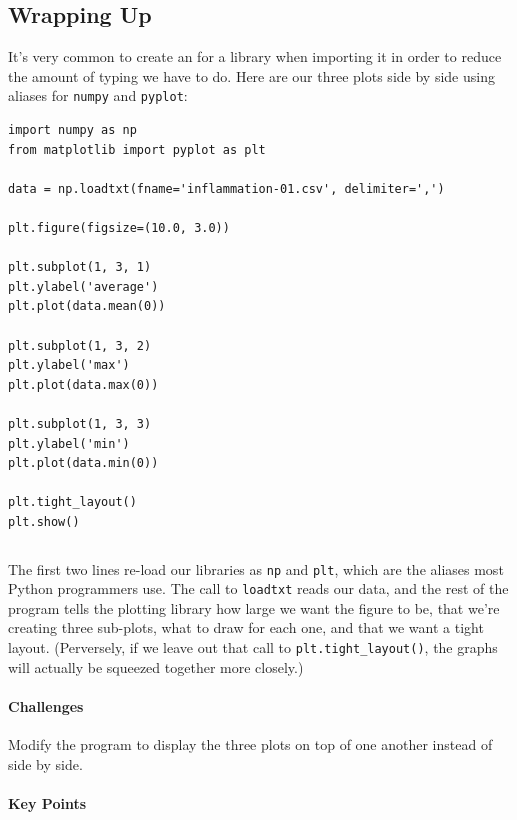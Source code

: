 \documentclass{book}
\begin{document}
\subsection{Wrapping Up}

It's very common to create an  for a
library when importing it in order to reduce the amount of typing we
have to do. Here are our three plots side by side using aliases for
\texttt{numpy} and \texttt{pyplot}:

\begin{verbatim}
import numpy as np
from matplotlib import pyplot as plt

data = np.loadtxt(fname='inflammation-01.csv', delimiter=',')

plt.figure(figsize=(10.0, 3.0))

plt.subplot(1, 3, 1)
plt.ylabel('average')
plt.plot(data.mean(0))

plt.subplot(1, 3, 2)
plt.ylabel('max')
plt.plot(data.max(0))

plt.subplot(1, 3, 3)
plt.ylabel('min')
plt.plot(data.min(0))

plt.tight_layout()
plt.show()
\end{verbatim}

\begin{verbatim}
\end{verbatim}

The first two lines re-load our libraries as \texttt{np} and
\texttt{plt}, which are the aliases most Python programmers use. The
call to \texttt{loadtxt} reads our data, and the rest of the program
tells the plotting library how large we want the figure to be, that
we're creating three sub-plots, what to draw for each one, and that we
want a tight layout. (Perversely, if we leave out that call to
\texttt{plt.tight\_layout()}, the graphs will actually be squeezed
together more closely.)

\mbox{}\paragraph{Challenges}

\begin{swcenumerate}
\item
  Modify the program to display the three plots on top of one another
  instead of side by side.
\end{swcenumerate}

\mbox{}\paragraph{Key Points}
\end{document}
